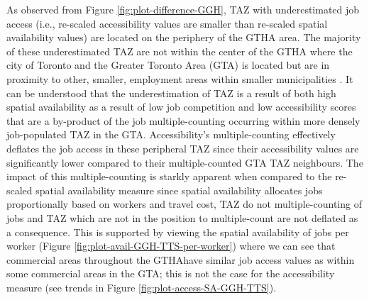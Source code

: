 \documentclass[]{elsarticle} %
\begin{document}
As observed from Figure \ref{fig:plot-difference-GGH}, TAZ with
underestimated job access (i.e., re-scaled accessibility values are
smaller than re-scaled spatial availability values) are located on the
periphery of the GTHA area. The majority of these underestimated TAZ are
not within the center of the GTHA where the city of Toronto and the
Greater Toronto Area (GTA) is located but are in proximity to other,
smaller, employment areas within smaller municipalities . It can be
understood that the underestimation of TAZ is a result of both high
spatial availability as a result of low job competition and low
accessibility scores that are a by-product of the job multiple-counting
occurring within more densely job-populated TAZ in the GTA.
Accessibility's multiple-counting effectively deflates the job access in
these peripheral TAZ since their accessibility values are significantly
lower compared to their multiple-counted GTA TAZ neighbours. The impact
of this multiple-counting is starkly apparent when compared to the
re-scaled spatial availability measure since spatial availability
allocates jobs proportionally based on workers and travel cost, TAZ do
not multiple-counting of jobs and TAZ which are not in the position to
multiple-count are not deflated as a consequence. This is supported by
viewing the spatial availability of jobs per worker (Figure
\ref{fig:plot-avail-GGH-TTS-per-worker}) where we can see that
commercial areas throughout the GTHAhave similar job access values as
within some commercial areas in the GTA; this is not the case for the
accessibility measure (see trends in Figure
\ref{fig:plot-access-SA-GGH-TTS}).
\end{document}

